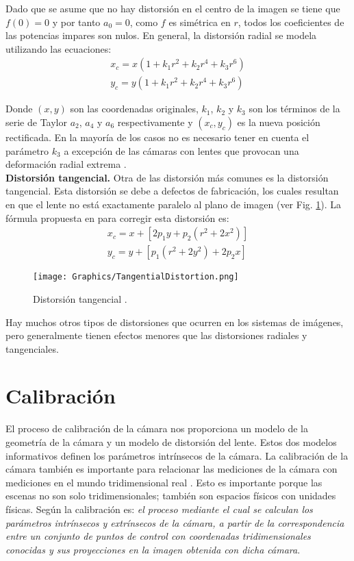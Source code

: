 Dado que se asume que no hay distorsión en el centro de la imagen se tiene que $f(0)=0$ y por tanto $a_0=0$, como $f$ es simétrica en $r$, todos los coeficientes de las potencias impares son nulos. En general, la distorsión radial se modela utilizando las ecuaciones:
\begin{gather*}
    x_c = x(1 + k_1 r^2 + k_2 r^4 + k_3 r^6)\\
    y_c = y(1 + k_1 r^2 + k_2 r^4 + k_3 r^6)
\end{gather*}

Donde $(x, y)$ son las coordenadas originales, $k_1$, $k_2$ y $k_3$ son los términos de la serie de Taylor $a_2$, $a_4$ y $a_6$ respectivamente y $(x_c, y_c)$ es la nueva posición rectificada. En la mayoría de los casos no es necesario tener en cuenta el parámetro $k_3$ a excepción de las cámaras con lentes que provocan una deformación radial extrema \cite{DVD}.\\

\textbf{Distorsión tangencial.}
Otra de las distorsión más comunes es la distorsión tangencial. Esta distorsión se debe a defectos de fabricación, los cuales resultan en que el lente no está exactamente paralelo al plano de imagen (ver Fig. \ref{fig:TangentialDistortion}). La fórmula propuesta en \cite{GaryAdrian} para corregir esta distorsión es:
\begin{gather*}
    x_c = x + [2p_1y + p_2(r^2 + 2x^2)]\\
    y_c = y + [p_1(r^2 + 2y^2) + 2p_2x]
\end{gather*}

\begin{figure}[h!]
	\centering
	\texttt{[image: Graphics/TangentialDistortion.png]}
	\caption{Distorsión tangencial \cite{DVD}.}
	\label{fig:TangentialDistortion}
\end{figure}

Hay muchos otros tipos de distorsiones que ocurren en los sistemas de imágenes, pero generalmente tienen efectos menores que las distorsiones radiales y tangenciales.

\section{Calibración}

El proceso de calibración de la cámara nos proporciona un modelo de la geometría de la cámara y un modelo de distorsión del lente. Estos dos modelos informativos definen los parámetros intrínsecos de la cámara. La calibración de la cámara también es importante para relacionar las mediciones de la cámara con mediciones en el mundo tridimensional real \cite{GaryAdrian}. Esto es importante porque las escenas no son solo tridimensionales; también son espacios físicos con unidades físicas. Según \cite{GaryAdrian} la calibración es: \textit{el proceso mediante el cual se calculan los parámetros intrínsecos y extrínsecos de la cámara, a partir de la correspondencia entre un conjunto de puntos de control con coordenadas tridimensionales conocidas y sus proyecciones en la imagen obtenida con dicha cámara}.

